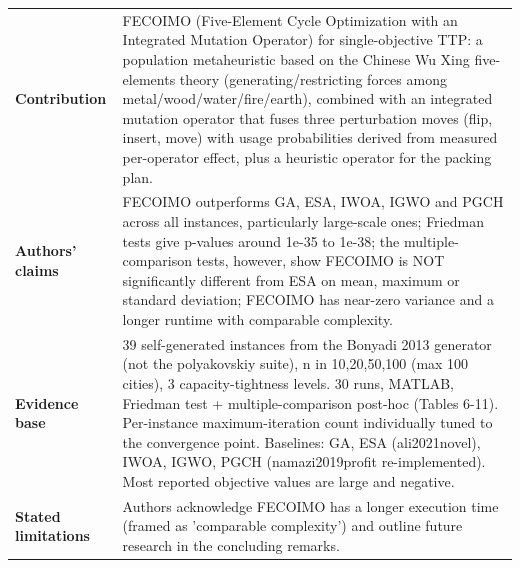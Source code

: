 \documentclass[
  a4paper,
  11pt,
  headings=small,
  numbers=noenddot,
  abstract=on,
  parskip=half,
]{scrartcl}
\begin{document}
\begin{landscape}
\begin{longtable}{@{}p{2.6cm}p{8.7cm}p{2.6cm}p{8.7cm}@{}}
\textbf{Contribution} & \multicolumn{3}{p{20.0cm}}{FECOIMO (Five-Element Cycle Optimization with an Integrated Mutation Operator) for single-objective TTP: a population metaheuristic based on the Chinese Wu Xing five-elements theory (generating/restricting forces among metal/wood/water/fire/earth), combined with an integrated mutation operator that fuses three perturbation moves (flip, insert, move) with usage probabilities derived from measured per-operator effect, plus a heuristic operator for the packing plan.} \\
\textbf{Authors' claims} & \multicolumn{3}{p{20.0cm}}{FECOIMO outperforms GA, ESA, IWOA, IGWO and PGCH across all instances, particularly large-scale ones; Friedman tests give p-values around 1e-35 to 1e-38; the multiple-comparison tests, however, show FECOIMO is NOT significantly different from ESA on mean, maximum or standard deviation; FECOIMO has near-zero variance and a longer runtime with comparable complexity.} \\
\textbf{Evidence base} & \multicolumn{3}{p{20.0cm}}{39 self-generated instances from the Bonyadi 2013 generator (not the polyakovskiy suite), n in {10,20,50,100} (max 100 cities), 3 capacity-tightness levels. 30 runs, MATLAB, Friedman test + multiple-comparison post-hoc (Tables 6-11). Per-instance maximum-iteration count individually tuned to the convergence point. Baselines: GA, ESA (ali2021novel), IWOA, IGWO, PGCH (namazi2019profit re-implemented). Most reported objective values are large and negative.} \\
\textbf{Stated limitations} & \multicolumn{3}{p{20.0cm}}{Authors acknowledge FECOIMO has a longer execution time (framed as 'comparable complexity') and outline future research in the concluding remarks.} \\

\end{longtable}
\end{landscape}
\end{document}
